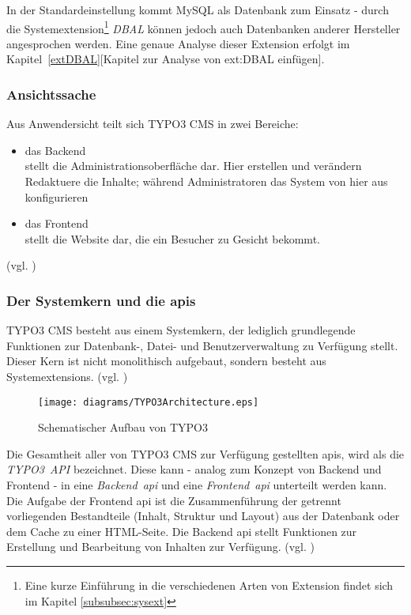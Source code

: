 In der Standardeinstellung kommt MySQL als Datenbank zum Einsatz - durch die Systemextension\footnote{Eine kurze Einführung in die verschiedenen Arten von Extension findet sich im Kapitel \ref{subsubsec:sysext}} \textit{DBAL} können jedoch auch Datenbanken anderer Hersteller angesprochen werden. Eine genaue Analyse dieser Extension erfolgt im Kapitel~\ref{extDBAL}[Kapitel zur Analyse von ext:DBAL einfügen].

\subsubsection{Ansichtssache}
Aus Anwendersicht teilt sich TYPO3 CMS in zwei Bereiche:

\begin{itemize}
	\item das Backend\\
		stellt die Administrationsoberfläche dar. Hier erstellen und verändern Redaktuere die Inhalte; während Administratoren das System von hier aus konfigurieren
	\item das Frontend\\
		stellt die Website dar, die ein Besucher zu Gesicht bekommt.
\end{itemize}
(vgl. \cite[S. 5]{book:dulepovTypo32008})

\subsubsection{Der Systemkern und die \gls{api}s}
\label{basics:typo3:subsubsec:coreAndApi}
TYPO3 CMS besteht aus einem Systemkern, der lediglich grundlegende Funktionen zur Datenbank-, Datei- und Benutzerverwaltung zu Verfügung stellt. Dieser Kern ist nicht monolithisch aufgebaut, sondern besteht aus Systemextensions. (vgl. \cite[S. 32]{book:laborenzTypo32006})

\begin{figure}[H]
	\centering
	\texttt{[image: diagrams/TYPO3Architecture.eps]}
	\caption{Schematischer Aufbau von TYPO3}
	\label{fig:typo3Architecture}
\end{figure}

Die Gesamtheit aller von TYPO3 CMS zur Verfügung gestellten \gls{api}s, wird als die \mbox{\textit{TYPO3 API}} bezeichnet. Diese kann - analog zum Konzept von Backend und Frontend - in eine \mbox{\textit{Backend \gls{api}}} und eine \mbox{\textit{Frontend \gls{api}}} unterteilt werden kann. Die Aufgabe der Frontend \gls{api} ist die Zusammenführung der getrennt vorliegenden Bestandteile (Inhalt, Struktur und Layout) aus der Datenbank oder dem Cache zu einer HTML-Seite. Die Backend \gls{api} stellt Funktionen zur Erstellung und Bearbeitung von Inhalten zur Verfügung. (vgl. \cite[S. 5 ff.]{book:dulepovTypo32008})

